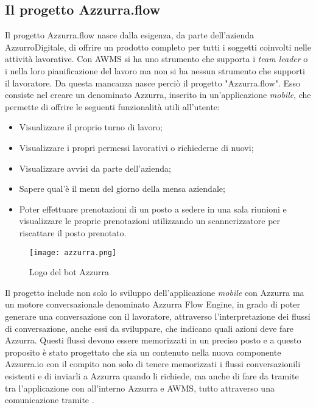 \subsection{Il progetto Azzurra.flow}

Il progetto Azzurra.flow nasce dalla esigenza, da parte dell'azienda AzzurroDigitale, di offrire un prodotto completo per tutti i soggetti coinvolti nelle attività lavorative. Con \gls{AWMS} si ha uno strumento che supporta i \emph{team leader} o i  nella loro pianificazione del lavoro ma non si ha nessun strumento che supporti il lavoratore. Da questa mancanza nasce perciò il progetto "Azzurra.flow". Esso consiste nel creare un  denominato Azzurra, inserito in un’applicazione \emph{mobile}, che permette di offrire le seguenti funzionalità utili all'utente:
\begin{itemize}
	\item Visualizzare il proprio turno di lavoro;
	\item Visualizzare i propri permessi lavorativi o richiederne di nuovi;
	\item Visualizzare avvisi da parte dell'azienda;
	\item Sapere qual'è il menu del giorno della mensa aziendale;
	\item Poter effettuare prenotazioni di un posto a sedere in una sala riunioni e visualizzare le proprie prenotazioni utilizzando un scannerizzatore  per riscattare il posto prenotato.
\end{itemize}
\begin{figure}[!h] 
	\begin{center}
		\texttt{[image: azzurra.png]}
		\caption{Logo del bot Azzurra}
	\end{center}
\end{figure}
Il progetto include non solo lo sviluppo dell'applicazione \emph{mobile} con Azzurra ma un motore conversazionale denominato Azzurra Flow Engine, in grado di poter generare una conversazione con il lavoratore, attraverso l'interpretazione dei flussi di conversazione, anche essi da sviluppare, che indicano quali azioni deve fare Azzurra. Questi flussi devono essere memorizzati in un preciso posto e a questo proposito è stato progettato che sia un  contenuto nella nuova componente Azzurra.io con il compito non solo di tenere memorizzati i flussi conversazionili esistenti e di inviarli a Azzurra quando li richiede, ma anche di fare da tramite tra l'applicazione con all'interno Azzurra e \gls{AWMS}, tutto attraverso una comunicazione tramite .
